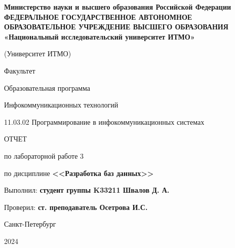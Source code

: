 \documentclass[a4paper, 14pt]{extarticle}
\begin{document}
\begin{titlepage}
  \vspace{0pt plus2fill}
  \noindent

  \vspace{0pt plus6fill}
  \begin{center}
    {
    \bfseries
    Министерство науки и высшего образования Российской Федерации
    {
    \scriptsize
    ФЕДЕРАЛЬНОЕ ГОСУДАРСТВЕННОЕ АВТОНОМНОЕ ОБРАЗОВАТЕЛЬНОЕ УЧРЕЖДЕНИЕ ВЫСШЕГО
    ОБРАЗОВАНИЯ
    }
    «Национальный исследовательский университет ИТМО»

    (Университет ИТМО)

    \begin{minipage}[t]{0.42\textwidth}
      \vspace*{0pt}
      \begin{flushright}
        Факультет

        Образовательная программа
      \end{flushright}
    \end{minipage}
    \begin{minipage}[t]{0.57\textwidth}
      \vspace*{0pt}
      \begin{flushright}
        Инфокоммуникационных технологий

        11.03.02 Программирование в инфокоммуникационных системах
      \end{flushright}
    \end{minipage}
    }

    \vspace{0pt plus5fill}

    \LARGE{
      ОТЧЕТ

      по лабораторной работе 3

      по дисциплине \textbf{<<Разработка баз данных>>}
    }
  \end{center}

  \vspace{0pt plus4fill}
  \begin{flushright}
    Выполнил: \textbf{студент группы K33211 Швалов Д. А.}

    Проверил: \textbf{ст. преподаватель Осетрова И.С.}
  \end{flushright}

  \vspace{0pt plus8fill}
  \begin{center}
    Санкт-Петербург

    2024
  \end{center}
\end{titlepage}
\end{document}

